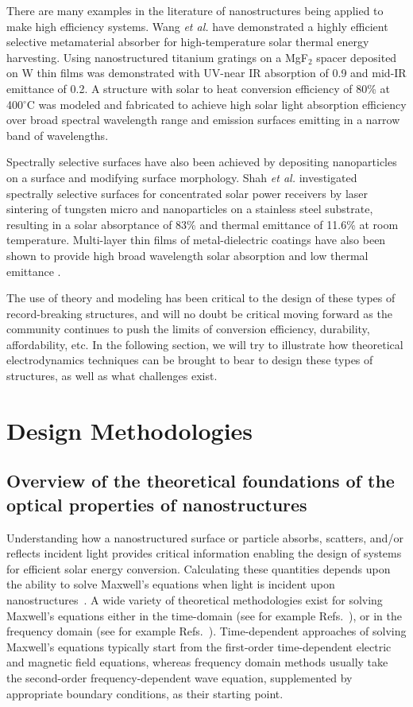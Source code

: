 \documentclass[10pt,letterpaper]{article}
\begin{document}
There are many examples in the literature of nanostructures being applied to make high efficiency systems.  Wang {\it et al.} \cite{g15} have demonstrated a highly efficient selective metamaterial absorber for high-temperature solar thermal energy harvesting. Using nanostructured titanium gratings on a MgF$_2$ spacer deposited on W thin films was demonstrated with UV-near IR absorption of 0.9 and mid-IR emittance of 0.2.  
A structure with solar to heat conversion efficiency of 80\% at 400$^\circ$C was 
modeled and fabricated to achieve high solar light absorption efficiency over broad spectral wavelength range and emission surfaces emitting in a narrow band of wavelengths. 

Spectrally selective surfaces have also been achieved by depositing nanoparticles on a 
surface and 
modifying surface morphology.  Shah {\it et al.} \cite{g21} investigated spectrally 
selective surfaces for concentrated solar power 
receivers by laser sintering of tungsten micro and nanoparticles on a stainless steel 
substrate, resulting 
in a solar absorptance of 83\% and thermal emittance of 11.6\% at 
room temperature.  Multi-layer thin films of metal-dielectric coatings have also been shown to provide high broad wavelength solar absorption and low thermal emittance \cite{g22}.

The use of theory and modeling has been critical to the design of these types of record-breaking
structures, and will no doubt be critical moving forward as the community continues to push
the limits of conversion efficiency, durability, affordability, etc.
In the following section, we will try to illustrate how theoretical electrodynamics techniques
can be brought to bear to design these types of structures, as well as what challenges exist.

\section{Design Methodologies}

\subsection{Overview of the theoretical foundations of the optical properties of nanostructures}

Understanding how a nanostructured surface or particle absorbs, scatters, and/or reflects incident light provides
critical information enabling the design of systems for efficient solar
energy conversion.  Calculating these quantities depends upon the ability to solve Maxwell's
equations when light is incident upon nanostructures~\cite{G_JPCC_2013}.   A wide variety of theoretical 
methodologies exist for solving Maxwell's equations either in the time-domain (see for example 
Refs.~\cite{Taflove_FDTD,Meep}), 
or in the frequency domain (see for example Refs.~\cite{Bohren,Yeh,DF_JOptSocA_1994,fem}). 
Time-dependent approaches of solving Maxwell's equations 
typically start from the first-order time-dependent electric
and magnetic field equations,  whereas frequency domain methods usually take the second-order frequency-dependent wave equation, 
supplemented by appropriate boundary conditions, as their starting point.
\end{document}
